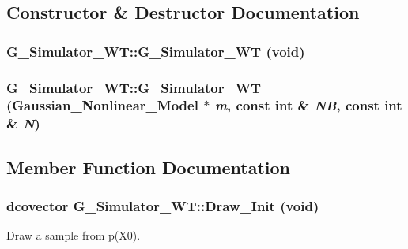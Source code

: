 \subsection{Constructor \& Destructor Documentation}
\hypertarget{class_g___simulator___w_t_1d369912b29be6b65bdd0b8ef0769e71}{
\subsubsection[{G\_\-Simulator\_\-WT}]{\setlength{\rightskip}{0pt plus 5cm}G\_\-Simulator\_\-WT::G\_\-Simulator\_\-WT (void)}}
\label{class_g___simulator___w_t_1d369912b29be6b65bdd0b8ef0769e71}


\hypertarget{class_g___simulator___w_t_307f1d93fda73646944844843d4b53ac}{
\subsubsection[{G\_\-Simulator\_\-WT}]{\setlength{\rightskip}{0pt plus 5cm}G\_\-Simulator\_\-WT::G\_\-Simulator\_\-WT ({\bf Gaussian\_\-Nonlinear\_\-Model} $\ast$ {\em m}, \/  const int \& {\em NB}, \/  const int \& {\em N})}}
\label{class_g___simulator___w_t_307f1d93fda73646944844843d4b53ac}




\subsection{Member Function Documentation}
\hypertarget{class_g___simulator___w_t_4dab061e25ad9b7b6c279d65ea3038d2}{
\subsubsection[{Draw\_\-Init}]{\setlength{\rightskip}{0pt plus 5cm}dcovector G\_\-Simulator\_\-WT::Draw\_\-Init (void)}}
\label{class_g___simulator___w_t_4dab061e25ad9b7b6c279d65ea3038d2}


Draw a sample from p(X0). 

